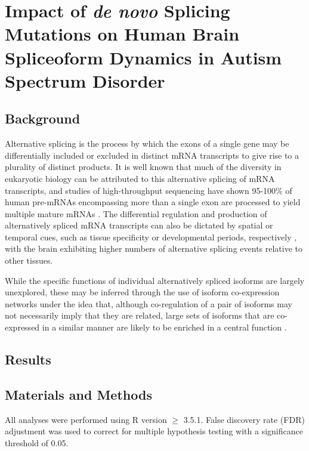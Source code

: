 \chapter{Impact of \textit{de novo} Splicing Mutations on Human Brain Spliceoform Dynamics in Autism Spectrum Disorder}
\section{Background}
Alternative splicing is the process by which the exons of a single gene may be differentially included or excluded in distinct mRNA transcripts to give rise to a plurality of distinct products. It is well known that much of the diversity in eukaryotic biology can be attributed to this alternative splicing of mRNA transcripts, and studies of high-throughput sequencing have shown 95-100\% of human pre-mRNAs encompassing more than a single exon are processed to yield multiple mature mRNAs \cite{Pan2008, Wang2008}. The differential regulation and production of alternatively spliced mRNA transcripts can also be dictated by spatial or temporal cues, such as tissue specificity or developmental periods, respectively \cite{Nilsen2010, Porter2018}, with the brain exhibiting higher numbers of alternative splicing events relative to other tissues\cite{Pan2008, Yeo2004, Xu2002}.\par

While the specific functions of individual alternatively spliced isoforms are largely unexplored, these may be inferred through the use of isoform co-expression networks under the idea that, although co-regulation of a pair of isoforms may not necessarily imply that they are related, large sets of isoforms that are co-expressed in a similar manner are likely to be enriched in a central function \cite{Carter2004, Stuart2003}. 

\section{Results}

\section{Materials and Methods}
All analyses were performed using R version $\geq$ 3.5.1. False discovery rate (FDR) adjustment was used to correct for multiple hypothesis testing with a significance threshold of 0.05.

